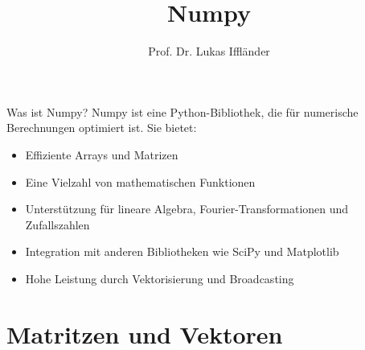 \documentclass[xelatex,aspectratio=169]{beamer}
\title{Numpy}
\author{Prof. Dr. Lukas Iffländer}
\institute{HTW Dresden}
\date{}
\begin{document}
\begin{frame}
    \titlepage
\end{frame}

\begin{frame}{Was ist Numpy?}
    Numpy ist eine Python-Bibliothek, die für numerische Berechnungen optimiert ist. Sie bietet:
    \begin{itemize}
        \item Effiziente Arrays und Matrizen
        \item Eine Vielzahl von mathematischen Funktionen
        \item Unterstützung für lineare Algebra, Fourier-Transformationen und Zufallszahlen
        \item Integration mit anderen Bibliotheken wie SciPy und Matplotlib
        \item Hohe Leistung durch Vektorisierung und Broadcasting
    \end{itemize}

\end{frame}

\section{Matritzen und Vektoren}
\end{document}
